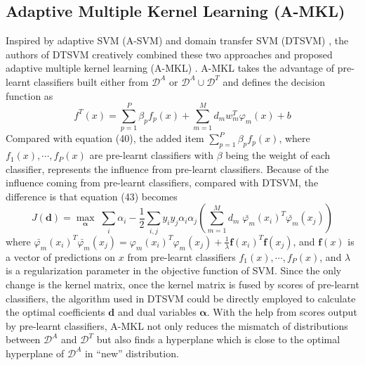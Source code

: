 \subsection{Adaptive Multiple Kernel Learning (A-MKL)}
Inspired by adaptive SVM (A-SVM) \cite{yang2007cross} and domain transfer SVM (DTSVM) \cite{duan2009domain}, the authors of DTSVM creatively combined these two approaches and proposed adaptive multiple kernel learning (A-MKL) \cite{duan2012visual}.  A-MKL takes the advantage of pre-learnt classifiers built either from $\mathcal{D}^A$ or $\mathcal{D}^A \cup \mathcal{D}^T$ and defines the decision function as
\begin{equation}
f^T(x) = \sum_{p=1}^{P} \beta_p f_p(x) + \sum_{m=1}^{M} d_m w_m^T \varphi_m(x) + b 
\end{equation}
Compared with equation (40), the added item $\sum_{p=1}^{P} \beta_p f_p(x)$, where $f_1(x), \cdots, f_P(x)$ are pre-learnt classifiers with $\beta$ being the weight of each classifier, represents the influence from pre-learnt classifiers. Because of the influence coming from pre-learnt classifiers, compared with DTSVM, the difference is that equation (43) becomes
\begin{equation}
J(\mathbf{d}) = \underset{\boldsymbol{\alpha}}{\max} \; \sum_i \alpha_i - \frac{1}{2} \sum_{i,j} y_i y_j \alpha_i \alpha_j  (\sum_{m=1}^M d_m \; \breve{\varphi_m} (x_i) ^T \breve{\varphi_m} (x_j))           
\end{equation}
where $\breve{\varphi_m} (x_i) ^T \breve{\varphi_m} (x_j) = \varphi_m (x_i) ^T \varphi_m (x_j) + \frac{1}{\lambda} \boldsymbol{f} (x_i)^T \boldsymbol{f}  (x_j)$, and $\boldsymbol{f}(x)$ is a vector of predictions on $x$ from pre-learnt classifiers $f_1(x), \cdots, f_P(x)$, and $\lambda$ is a regularization parameter in the objective function of SVM. Since the only change is the kernel matrix, once the kernel matrix is fused by scores of pre-learnt classifiers, the algorithm used in DTSVM could be directly employed to calculate the optimal coefficients $\mathbf{d}$ and dual variables $\boldsymbol{\alpha}$. With the help from scores output by pre-learnt classifiers, A-MKL not only reduces the mismatch of distributions between $\mathcal{D}^A$ and $\mathcal{D}^T$ but also finds a hyperplane which is close to the optimal hyperplane of $\mathcal{D}^A$ in ``new'' distribution. 
